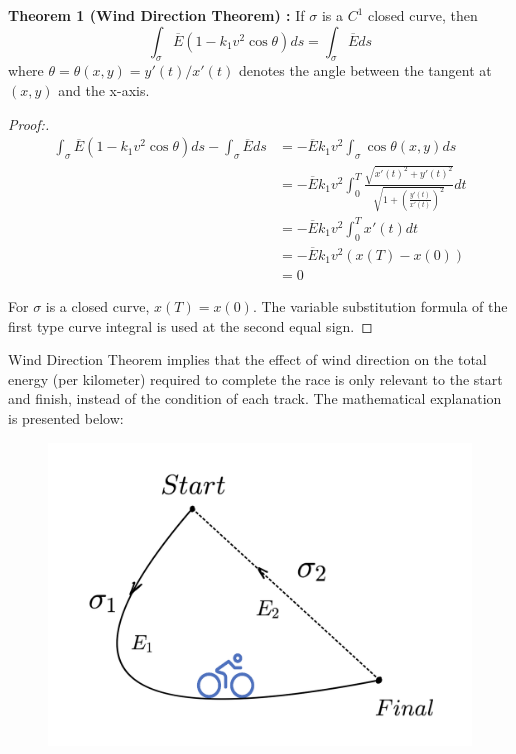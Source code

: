 {\bf Theorem 1 (Wind Direction Theorem) :} If $\sigma$ is a $C^1$ closed curve, then
\begin{equation}\label{WDT}
	\int_{\sigma} \overline{E}(1-k_1v^2\cos\theta)ds = \int_{\sigma} \overline{E} ds
\end{equation}
 where $\theta=\theta(x,y)=y'(t)/x'(t)$ denotes the angle between the tangent at $(x,y)$ and the x-axis. 
\begin{proof}[Proof:]

\begin{equation}
	\begin{aligned}
	\int_{\sigma} \overline{E}(1-k_1v^2\cos\theta)ds - \int_{\sigma} \overline{E} ds
	&= -\overline{E}k_1v^2 \int_{\sigma} \cos\theta(x,y) ds\\
	&= -\overline{E}k_1v^2 \int_0^T \frac{\sqrt{x'(t)^2+y'(t)^2}}{\sqrt{1+(\frac{y'(t)}{x'(t)})^2}} dt\\
	&= -\overline{E}k_1v^2 \int_0^T x'(t) dt\\
	&= -\overline{E}k_1v^2 (x(T)-x(0))\\
	&= 0
\end{aligned}
\end{equation}
\par For $\sigma$ is a closed curve, $x(T)=x(0)$. The variable substitution formula of the first type curve integral is used at the second equal sign.
\end{proof}
\begin{flushleft}
	\qquad Wind Direction Theorem implies that the effect of wind direction on the total energy (per kilometer) required to complete the race is only relevant to the start and finish, instead of the condition of each track. The mathematical explanation is presented below:
\end{flushleft}
\begin{figure} %
	\includegraphics[width=0.8\linewidth]{image/fig1}
	\label{fig1}
\end{figure}
